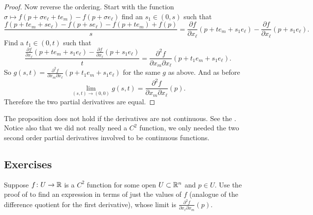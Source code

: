\begin{proof}
Now reverse the ordering.  Start with
the function $\sigma \mapsto f(p+\sigma e_{\ell} + te_m)-f(p + \sigma
e_{\ell})$
find an $s_1 \in (0,s)$ such that
\begin{equation*}
\frac{f(p+te_m + se_{\ell})- f(p+s e_{\ell}) - f(p+t e_m)+f(p)}{s}
=
\frac{\partial f}{\partial x_{\ell}}(p + t e_m + s_1 e_{\ell})
-
\frac{\partial f}{\partial x_{\ell}}(p + s_1 e_{\ell}) .
\end{equation*}
Find a $t_1 \in (0,t)$ such that
\begin{equation*}
\frac{\frac{\partial f}{\partial x_{\ell}}(p + t e_m + s_1 e_{\ell})
-
\frac{\partial f}{\partial x_{\ell}}(p + s_1 e_{\ell})}{t}
=
\frac{\partial^2 f}{\partial x_m \partial x_{\ell}}(p + t_1 e_m + s_1
e_{\ell}) .
\end{equation*}
So $g(s,t) = \frac{\partial^2 f}{\partial x_m \partial
x_{\ell}}(p + t_1 e_m + s_1 e_{\ell})$ for the same $g$ as above.  And as before
\begin{equation*}
\lim_{(s,t) \to (0,0)} g(s,t) = 
\frac{\partial^2 f}{\partial x_m \partial x_{\ell}}(p) .
\end{equation*}
Therefore the two partial derivatives are equal.
\end{proof}

The proposition does not hold if the derivatives are not
continuous.  See the .
Notice also that we did not really need a $C^2$ function, we only needed the
two second order partial derivatives involved to be continuous functions.

\subsection{Exercises}

\begin{exercise}
Suppose $f \colon U \to {\mathbb{R}}$ is a $C^2$ function for some open $U \subset
{\mathbb{R}}^n$ and $p \in U$.
Use the proof of  to find an expression
in terms of just the values of $f$ (analogue of the difference quotient
for the first derivative), whose limit is
$\frac{\partial^2 f}{ \partial x_{\ell} \partial x_m}(p)$.
\end{exercise}

